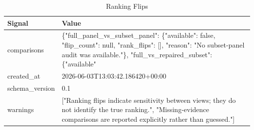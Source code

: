 \begin{table}[t]
\centering
\caption{Ranking Flips}
\begin{tabular}{ll}
\toprule
Signal & Value \\
\midrule
comparisons & \{"full\_panel\_vs\_subset\_panel": \{"available": false, "flip\_count": null, "rank\_flips": [], "reason": "No subset-panel audit was available."\}, "full\_vs\_repaired\_subset": \{"available" \\
created\_at & 2026-06-03T13:03:42.186420+00:00 \\
schema\_version & 0.1 \\
warnings & ["Ranking flips indicate sensitivity between views; they do not identify the true ranking.", "Missing-evidence comparisons are reported explicitly rather than guessed."] \\
\bottomrule
\end{tabular}
\end{table}
